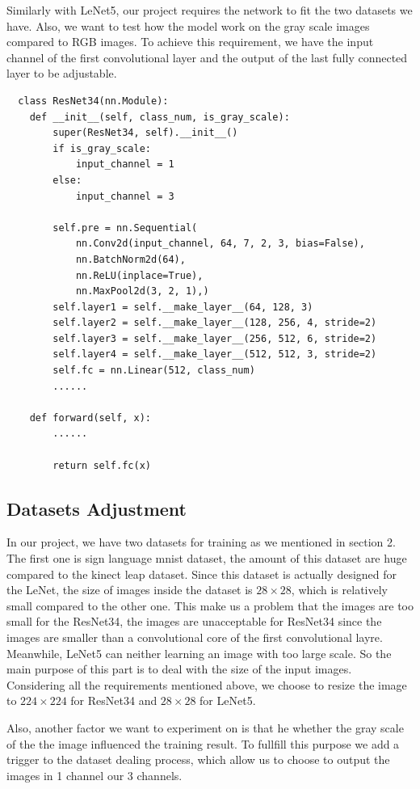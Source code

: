 \documentclass[12pt]{article}
\begin{document}
Similarly with LeNet5, our project requires the network to fit the two datasets we have. Also, we want to test how the model work on the gray scale images compared to RGB images. To achieve this requirement, we have the input channel of the first convolutional layer and the output of the last fully connected layer to be adjustable. 

\begin{lstlisting}
  class ResNet34(nn.Module):
    def __init__(self, class_num, is_gray_scale):
        super(ResNet34, self).__init__()
        if is_gray_scale:
            input_channel = 1
        else:
            input_channel = 3

        self.pre = nn.Sequential(
            nn.Conv2d(input_channel, 64, 7, 2, 3, bias=False),
            nn.BatchNorm2d(64),
            nn.ReLU(inplace=True),
            nn.MaxPool2d(3, 2, 1),)
        self.layer1 = self.__make_layer__(64, 128, 3)
        self.layer2 = self.__make_layer__(128, 256, 4, stride=2)
        self.layer3 = self.__make_layer__(256, 512, 6, stride=2)
        self.layer4 = self.__make_layer__(512, 512, 3, stride=2)
        self.fc = nn.Linear(512, class_num)
        ......

    def forward(self, x):
        ......

        return self.fc(x)
\end{lstlisting}

\subsection{Datasets Adjustment}
In our project, we have two datasets for training as we mentioned in section 2. The first one is sign language mnist dataset, the amount of this dataset are huge compared to the kinect leap dataset. Since this dataset is actually designed for the LeNet, the size of images inside the dataset is $28\times 28$, which is relatively small compared to the other one. This make us a problem that the images are too small for the ResNet34, the images are unacceptable for ResNet34 since the images are smaller than a convolutional core of the first convolutional layre. Meanwhile, LeNet5 can neither learning an image with too large scale. So the main purpose of this part is to deal with the size of the input images. Considering all the requirements mentioned above, we choose to resize the image to $224 \times 224$ for ResNet34 and $28\times 28$ for LeNet5.

Also, another factor we want to experiment on is that he whether the gray scale of the the image influenced the training result. To fullfill this purpose we add a trigger to the dataset dealing process, which allow us to choose to output the images in 1 channel our 3 channels. 
\end{document}
